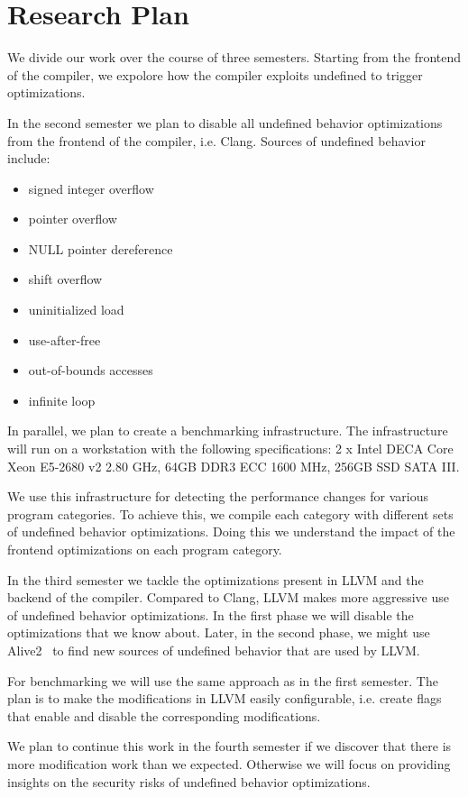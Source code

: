 \section{Research Plan} \label{sec:rp}

We divide our work over the course of three semesters. Starting from the
frontend of the compiler, we expolore how the compiler exploits
undefined to trigger optimizations.

In the second semester we plan to disable all undefined behavior
optimizations from the frontend of the compiler, i.e. Clang. Sources of
undefined behavior include:
\begin{itemize}
  \item signed integer overflow
  \item pointer overflow
  \item NULL pointer dereference
  \item shift overflow
  \item uninitialized load
  \item use-after-free
  \item out-of-bounds accesses
  \item infinite loop
\end{itemize}

In parallel, we plan to create a benchmarking infrastructure. The
infrastructure will run on a workstation with the following
specifications: 2 x Intel DECA Core Xeon E5-2680 v2 2.80 GHz, 64GB DDR3
ECC 1600 MHz, 256GB SSD SATA III.

We use this infrastructure for detecting the performance changes for
various program categories. To achieve this, we compile each category
with different sets of undefined behavior optimizations. Doing this we
understand the impact of the frontend optimizations on each program
category.

In the third semester we tackle the optimizations present in LLVM and
the backend of the compiler. Compared to Clang, LLVM makes more
aggressive use of undefined behavior optimizations. In the first phase
we will disable the optimizations that we know about. Later, in the
second phase, we might use Alive2~\cite{lopes2021alive2} to find new
sources of undefined behavior that are used by LLVM.

For benchmarking we will use the same approach as in the first semester.
The plan is to make the modifications in LLVM easily configurable, i.e.
create flags that enable and disable the corresponding modifications.

We plan to continue this work in the fourth semester if we discover that
there is more modification work than we expected. Otherwise we will
focus on providing insights on the security risks of undefined behavior
optimizations.
